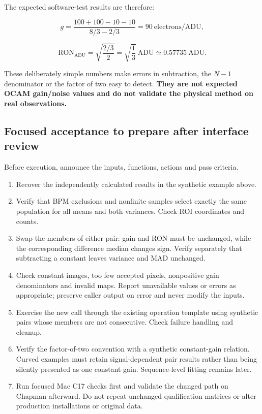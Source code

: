 \documentclass[
  10pt,
  a4paper,
]{article}
\providecommand{\tightlist}{%
  \setlength{\itemsep}{0pt}\setlength{\parskip}{0pt}}
\begin{document}
The expected software-test results are therefore:

\[
g=\frac{100+100-10-10}{8/3-2/3}
  =90\ \mathrm{electrons}/\mathrm{ADU},
\]

\[
\mathrm{RON}_{\mathrm{ADU}}
 =\sqrt{\frac{2/3}{2}}
 =\sqrt{\frac{1}{3}}\ \mathrm{ADU}
 \simeq0.57735\ \mathrm{ADU}.
\]

These deliberately simple numbers make errors in subtraction, the
\(N-1\) denominator or the factor of two easy to detect. \textbf{They
are not expected OCAM gain/noise values and do not validate the physical
method on real observations.}

\hypertarget{focused-acceptance-to-prepare-after-interface-review}{%
\subsection{Focused acceptance to prepare after interface
review}\label{focused-acceptance-to-prepare-after-interface-review}}

Before execution, announce the inputs, functions, actions and pass
criteria.

\begin{enumerate}
\def\labelenumi{\arabic{enumi}.}
\tightlist
\item
  Recover the independently calculated results in the synthetic example
  above.
\item
  Verify that BPM exclusions and nonfinite samples select exactly the
  same population for all means and both variances. Check ROI
  coordinates and counts.
\item
  Swap the members of either pair: gain and RON must be unchanged, while
  the corresponding difference median changes sign. Verify separately
  that subtracting a constant leaves variance and MAD unchanged.
\item
  Check constant images, too few accepted pixels, nonpositive gain
  denominators and invalid maps. Report unavailable values or errors as
  appropriate; preserve caller output on error and never modify the
  inputs.
\item
  Exercise the new call through the existing operation template using
  synthetic pairs whose members are not consecutive. Check failure
  handling and cleanup.
\item
  Verify the factor-of-two convention with a synthetic constant-gain
  relation. Curved examples must retain signal-dependent pair results
  rather than being silently presented as one constant gain.
  Sequence-level fitting remains later.
\item
  Run focused Mac C17 checks first and validate the changed path on
  Chapman afterward. Do not repeat unchanged qualification matrices or
  alter production installations or original data.
\end{enumerate}
\end{document}
